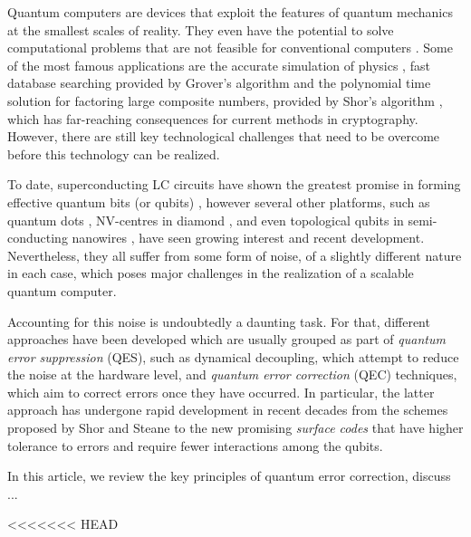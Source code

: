 Quantum computers are devices that exploit the features of quantum mechanics at
the smallest scales of reality. They even have the potential to solve
computational problems that are not feasible for conventional computers
\cite{nielsen_chuang_2010}. Some of the most famous applications are the
accurate simulation of physics \cite{feynman82_simul_physic_with_comput}, fast
database searching provided by Grover's algorithm \cite{Grover_1996} and the
polynomial time solution for factoring large composite numbers, provided by
Shor's algorithm \cite{Shor_1997}, which has far-reaching consequences for
current methods in cryptography. However, there are still key technological
challenges that need to be overcome before this technology can be realized.

To date, superconducting LC circuits have shown the greatest promise in forming
effective quantum bits (or qubits) \cite{Rol_2019}
\cite{barends14_super_quant_circuit_at_surfac}, however several other platforms,
such as quantum dots \cite{huang19_fidel_bench_two_qubit_gates_silic}
\cite{Lawrie_2020}, NV-centres in diamond \cite{Taminiau_2014}, and even
topological qubits in semi-conducting nanowires \cite{Mourik_2012}, have seen
growing interest and recent development. Nevertheless, they all suffer from some
form of noise, of a slightly different nature in each case, which poses
major challenges in the realization of a scalable quantum computer.

Accounting for this noise is undoubtedly a daunting task. For that, different
approaches have been developed which are usually grouped as part of
\textit{quantum error suppression} (QES), such as dynamical decoupling, which
attempt to reduce the noise at the hardware level, and \textit{quantum error
  correction} (QEC) techniques, which aim to correct errors once they have
occurred. In particular, the latter approach has undergone rapid development in
recent decades from the schemes proposed by Shor \cite{Shor_1995_QEC} and Steane
\cite{Steane_1996_QEC} to the new promising \textit{surface codes}
\cite{fowler12_surfac_codes} that have higher tolerance to errors and require
fewer interactions among the qubits.

In this article, we review the key principles of quantum error correction,
discuss ...

<<<<<<< HEAD
